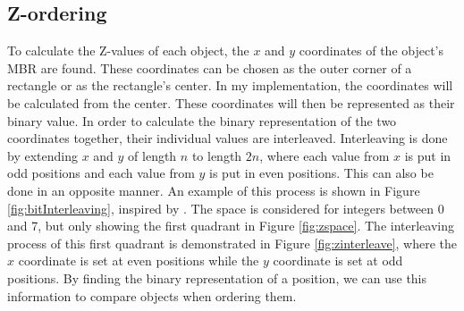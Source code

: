 \subsection{Z-ordering}
\label{sect:zordering}
To calculate the Z-values of each object, the $x$ and $y$ coordinates of the object's MBR are found. These coordinates can be chosen as the outer corner of a rectangle or as the rectangle's center. In my implementation, the coordinates will be calculated from the center. These coordinates will then be represented as their binary value. In order to calculate the binary representation of the two coordinates together, their individual values are interleaved. Interleaving is done by extending $x$ and $y$ of length $n$ to length $2n$, where each value from $x$ is put in odd positions and each value from $y$ is put in even positions\cite{interleave}. This can also be done in an opposite manner. An example of this process is shown in Figure \ref{fig:bitInterleaving}, inspired by \cite{zorder_figure}. The space is considered for integers between 0 and 7, but only showing the first quadrant in Figure \ref{fig:zspace}. The interleaving process of this first quadrant is demonstrated in Figure \ref{fig:zinterleave}, where the $x$ coordinate is set at even positions while the $y$ coordinate is set at odd positions. By finding the binary representation of a position, we can use this information to compare objects when ordering them. 

